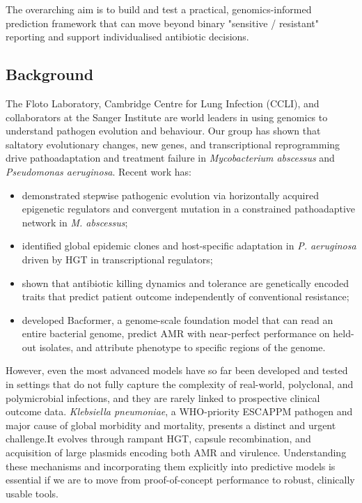 The overarching aim is to build and test a practical, genomics-informed prediction framework 
that can move beyond binary "sensitive / resistant" reporting and support individualised antibiotic decisions. 

\subsection*{Background}
The Floto Laboratory, Cambridge Centre for Lung Infection (CCLI), and collaborators at 
the Sanger Institute are world leaders in using genomics to understand pathogen evolution 
and behaviour. Our group has shown that saltatory evolutionary changes, new genes, 
and transcriptional reprogramming drive pathoadaptation and treatment failure 
in \textit{Mycobacterium abscessus} and \textit{Pseudomonas aeruginosa}. 
Recent work has:

\begin{itemize}
  \item demonstrated stepwise pathogenic evolution via horizontally acquired epigenetic regulators 
  and convergent mutation in a constrained pathoadaptive network in \textit{M. abscessus};
  \item identified global epidemic clones and host-specific adaptation in \textit{P. aeruginosa} 
  driven by HGT in transcriptional regulators;
  \item shown that antibiotic killing dynamics and tolerance are genetically encoded traits 
  that predict patient outcome independently of conventional resistance;
  \item developed Bacformer, a genome-scale foundation model that can read an entire bacterial genome, 
  predict AMR with near-perfect performance on held-out isolates, and attribute phenotype to specific regions of the genome.
\end{itemize}

However, even the most advanced models have so far been developed and tested in settings 
that do not fully capture the complexity of real-world, polyclonal, and polymicrobial infections, and they are rarely linked to prospective clinical outcome data. \textit{Klebsiella pneumoniae}, a WHO-priority ESCAPPM pathogen and major cause of global morbidity and mortality, presents a distinct and urgent challenge.It evolves through rampant HGT, capsule recombination, and acquisition of large plasmids encoding both AMR and virulence. 
Understanding these mechanisms and incorporating them explicitly into predictive models is essential if we are to move from proof-of-concept performance to robust, clinically usable tools.

